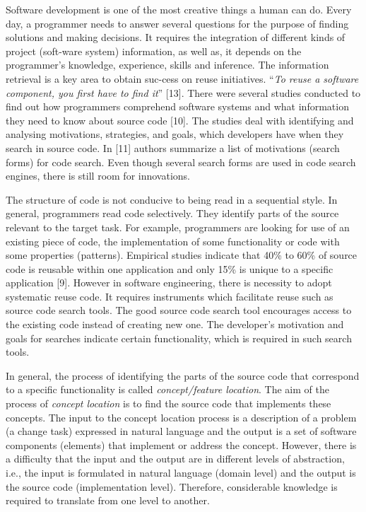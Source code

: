 \documentclass{llncs}
\begin{document}
\noindent Software development is one of the most creative things a human can do. Every day, a programmer needs to answer several questions for the purpose of finding solutions and making decisions. It requires the integration of different kinds of project (soft-ware system) information, as well as, it depends on the programmer's knowledge, experience, skills and inference. The information retrieval is a key area to obtain suc-cess on reuse initiatives. “\textit{To reuse a software component, you first have to find it}” [13]. There were several studies conducted to find out how programmers comprehend software systems and what information they need to know about source code [10]. The studies deal with identifying and analysing motivations, strategies, and goals, which developers have when they search in source code. In [11] authors summarize a list of motivations (search forms) for code search. Even though several search forms are used in code search engines, there is still room for innovations.

The structure of code is not conducive to being read in a sequential style. In general,
programmers read code selectively. They identify parts of the source relevant to
the target task. For example, programmers are looking for use of an existing piece of
code, the implementation of some functionality or code with some properties (patterns).
Empirical studies indicate that 40\% to 60\% of source code is reusable within
one application and only 15\% is unique to a specific application [9]. However in
software engineering, there is necessity to adopt systematic reuse code. It requires
instruments which facilitate reuse such as source code search tools. The good source
code search tool encourages access to the existing code instead of creating new one.
The developer’s motivation and goals for searches indicate certain functionality,
which is required in such search tools.

In general, the process of identifying the parts of the source code that correspond to
a specific functionality is called \textit{concept/feature location}. The aim of the process of
\textit{concept location} is to find the source code that implements these concepts. The input
to the concept location process is a description of a problem (a change task) expressed
in natural language and the output is a set of software components (elements) that
implement or address the concept. However, there is a difficulty that the input and the
output are in different levels of abstraction, i.e., the input is formulated in natural
language (domain level) and the output is the source code (implementation level).
Therefore, considerable knowledge is required to translate from one level to another.
\end{document}
